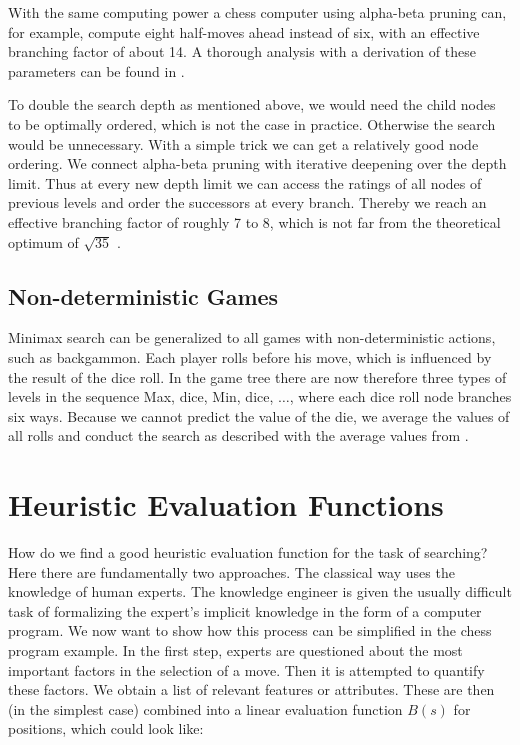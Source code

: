 \documentclass[10pt]{book}
\begin{document}
With the same computing power a chess computer using alpha-beta pruning can, for example, compute eight half-moves ahead instead of six, with an effective branching factor of about 14. A thorough analysis with a derivation of these parameters can be found in \cite{pearl1984heuristics}.

To double the search depth as mentioned above, we would need the child nodes to be optimally ordered, which is not the case in practice. Otherwise the search would be unnecessary. With a simple trick we can get a relatively good node ordering. We connect alpha-beta pruning with iterative deepening over the depth limit. Thus at every new depth limit we can access the ratings of all nodes of previous levels and order the successors at every branch. Thereby we reach an effective branching factor of roughly 7 to 8, which is not far from the theoretical optimum of $\sqrt{35}$ \cite{Nil98}.

\subsection{Non-deterministic Games}
Minimax search can be generalized to all games with non-deterministic actions, such as backgammon. Each player rolls before his move, which is influenced by the result of the dice roll. In the game tree there are now therefore three types of levels in the sequence
Max, dice, Min, dice, $\ldots$,
where each dice roll node branches six ways. Because we cannot predict the value of the die, we average the values of all rolls and conduct the search as described with the average values from \cite{RN10}.

\section{Heuristic Evaluation Functions}
How do we find a good heuristic evaluation function for the task of searching? Here there are fundamentally two approaches. The classical way uses the knowledge of human experts. The knowledge engineer is given the usually difficult task of formalizing the expert's implicit knowledge in the form of a computer program. We now want to show how this process can be simplified in the chess program example.
In the first step, experts are questioned about the most important factors in the selection of a move. Then it is attempted to quantify these factors. We obtain a list of relevant features or attributes. These are then (in the simplest case) combined into a linear evaluation function $B(s)$ for positions, which could look like:
\end{document}
